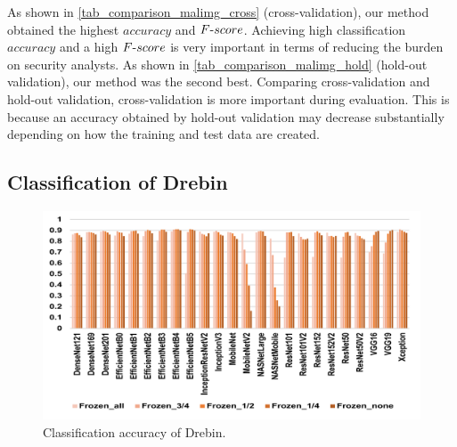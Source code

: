 \documentclass[conference]{IEEEtran}
\begin{document}
As shown in \autoref{tab_comparison_malimg_cross} (cross-validation), our method obtained the highest $accuracy$ and $F\mathchar`-score$. 
Achieving high classification $accuracy$ and a high $F\mathchar`-score$ is very important in terms of reducing the burden on security analysts. 
As shown in \autoref{tab_comparison_malimg_hold} (hold-out validation), our method was the second best.
Comparing cross-validation and hold-out validation, cross-validation is more important during evaluation. This is because an accuracy obtained by hold-out validation may decrease substantially depending on how the training and test data are created.

 
\subsection{Classification of Drebin}
\label{sec_drebin}

\begin{figure}[t]
	\centering
	\includegraphics[width=\linewidth,clip]{Drebin.pdf}
	\caption{Classification accuracy of Drebin.}
	\label{fig_drebin}
\end{figure}

\begin{table}[t]
	\caption{Top 5 models for Drebin.}
	\label{tab_top5_drebin}
	\centering
\end{table}
\end{document}
